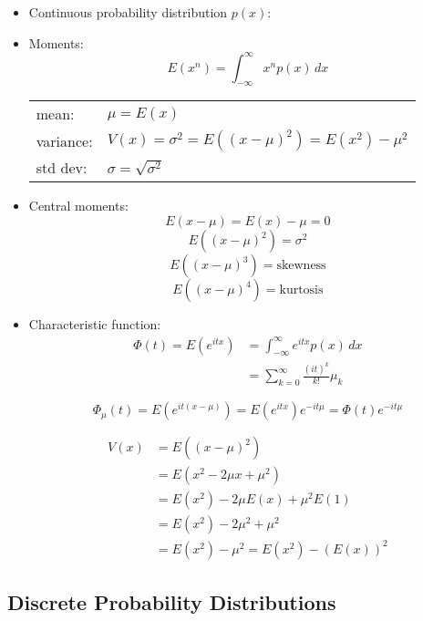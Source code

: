 \begin{itemize}
    \item Continuous probability distribution $p(x)$:
    \item Moments:
          \[ E(x^n) = \int_{-\infty}^{\infty} x^n p(x) \, dx \]

          \begin{tabular}[c]{ll}
              mean:     & $\mu = E(x)$                                      \\
              variance: & $V(x) = \sigma^2 = E((x-\mu)^2) = E(x^2) - \mu^2$ \\
              std dev:  & $\sigma = \sqrt{\sigma^2}$
          \end{tabular}

    \item Central moments:
          \[ E(x-\mu)= E(x) - \mu = 0 \]
          \[ E((x-\mu)^2) = \sigma^2 \]
          \[ E((x-\mu)^3) = \text{skewness} \]
          \[ E((x-\mu)^4) = \text{kurtosis} \]

    \item Characteristic function:
          \begin{align}
              \Phi(t) = E(e^{itx}) & = \int_{-\infty}^{\infty} e^{itx} p(x) \, dx  \\
                                   & = \sum_{k=0}^{\infty} \frac{(it)^k}{k!} \mu_k
          \end{align}

          \[ \Phi_{\mu}(t) = E(e^{it(x-\mu)}) = E(e^{itx}) e^{-it\mu} = \Phi(t) e^{-it\mu} \]

          \begin{align}
              V(x) & = E((x-\mu)^2)                       \\
                   & = E(x^2 - 2\mu x + \mu^2)            \\
                   & = E(x^2) - 2\mu E(x) + \mu^2 E(1)    \\
                   & = E(x^2) - 2\mu^2 + \mu^2            \\
                   & = E(x^2) - \mu^2 = E(x^2) - (E(x))^2
          \end{align}
\end{itemize}

\subsection{Discrete Probability Distributions}

